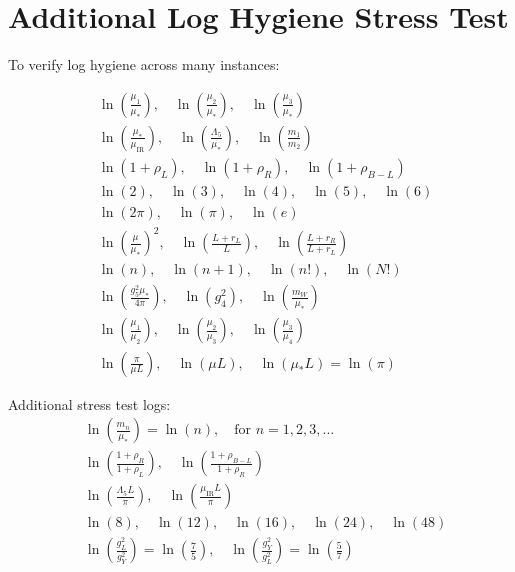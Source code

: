 \documentclass[11pt,a4paper]{article}
\theoremstyle{definition}
\begin{document}
\section{Additional Log Hygiene Stress Test}
\label{app:log_stress}

To verify log hygiene across many instances:

\begin{align}
\label{eq:log_stress_1}
&\ln\left(\frac{\mu_1}{\mu_*}\right), \quad \ln\left(\frac{\mu_2}{\mu_*}\right), \quad \ln\left(\frac{\mu_3}{\mu_*}\right) \\
\label{eq:log_stress_2}
&\ln\left(\frac{\mu_*}{\mu_{\text{IR}}}\right), \quad \ln\left(\frac{\Lambda_5}{\mu_*}\right), \quad \ln\left(\frac{m_1}{m_2}\right) \\
\label{eq:log_stress_3}
&\ln(1 + \rho_L), \quad \ln(1 + \rho_R), \quad \ln(1 + \rho_{B-L}) \\
\label{eq:log_stress_4}
&\ln(2), \quad \ln(3), \quad \ln(4), \quad \ln(5), \quad \ln(6) \\
\label{eq:log_stress_5}
&\ln(2\pi), \quad \ln(\pi), \quad \ln(e) \\
\label{eq:log_stress_6}
&\ln\left(\frac{\mu}{\mu_*}\right)^2, \quad \ln\left(\frac{L + r_L}{L}\right), \quad \ln\left(\frac{L + r_R}{L + r_L}\right) \\
\label{eq:log_stress_7}
&\ln(n), \quad \ln(n + 1), \quad \ln(n!), \quad \ln(N!) \\
\label{eq:log_stress_8}
&\ln\left(\frac{g_5^2\mu_*}{4\pi}\right), \quad \ln(g_4^2), \quad \ln\left(\frac{m_W}{\mu_*}\right) \\
\label{eq:log_stress_9}
&\ln\left(\frac{\mu_1}{\mu_2}\right), \quad \ln\left(\frac{\mu_2}{\mu_3}\right), \quad \ln\left(\frac{\mu_3}{\mu_4}\right) \\
\label{eq:log_stress_10}
&\ln\left(\frac{\pi}{\mu L}\right), \quad \ln(\mu L), \quad \ln(\mu_* L) = \ln(\pi)
\end{align}

Additional stress test logs:
\begin{align}
\label{eq:log_stress_11}
&\ln\left(\frac{m_n}{\mu_*}\right) = \ln(n), \quad \text{for } n = 1, 2, 3, \ldots \\
\label{eq:log_stress_12}
&\ln\left(\frac{1 + \rho_R}{1 + \rho_L}\right), \quad \ln\left(\frac{1 + \rho_{B-L}}{1 + \rho_R}\right) \\
\label{eq:log_stress_13}
&\ln\left(\frac{\Lambda_5 L}{\pi}\right), \quad \ln\left(\frac{\mu_{\text{IR}} L}{\pi}\right) \\
\label{eq:log_stress_14}
&\ln(8), \quad \ln(12), \quad \ln(16), \quad \ln(24), \quad \ln(48) \\
\label{eq:log_stress_15}
&\ln\left(\frac{g_L^2}{g_Y^2}\right) = \ln\left(\frac{7}{5}\right), \quad \ln\left(\frac{g_Y^2}{g_L^2}\right) = \ln\left(\frac{5}{7}\right)
\end{align}
\end{document}
